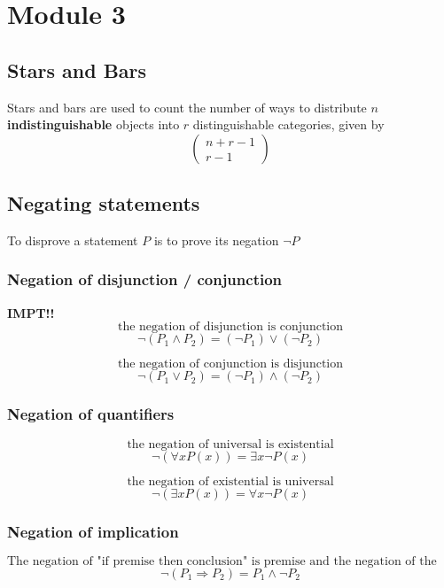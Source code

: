 \chapter{Module 3}

\section{Stars and Bars}

Stars and bars are used to count the number of ways to distribute $n$ \textbf{indistinguishable} objects into $r$ distinguishable categories, given by
\[
  \begin{pmatrix} 
    n + r - 1 \\ r - 1  
  \end{pmatrix}
\] 

\section{Negating statements}

To disprove a statement $P$ is to prove its negation $\lnot P$ 

\subsection{Negation of disjunction / conjunction}

\textbf{IMPT!!}
\[
  \text{the negation of disjunction is conjunction}
\] 
\[
  \lnot( P_1 \land P_2) = (\lnot P_1) \lor (\lnot P_2)
\] 


\[
  \text{the negation of conjunction is disjunction}
\] 
\[
  \lnot( P_1 \lor P_2) = (\lnot P_1) \land (\lnot P_2)
\] 

\subsection{Negation of quantifiers}

\[
  \text{the negation of universal is existential}
\] 
\[
  \lnot(\forall x P(x)) = \exists x \lnot P(x)
\] 

\[
  \text{the negation of existential is universal}
\] 
\[
  \lnot(\exists x P(x)) = \forall x \lnot P(x)
\] 

\subsection{Negation of implication}
\[
  \text{The negation of "if premise then conclusion" is premise and the negation of the conclusion}
\] 
\[
  \lnot(P_1 \Rightarrow P_2) = P_1 \land \lnot P_2
\] 

